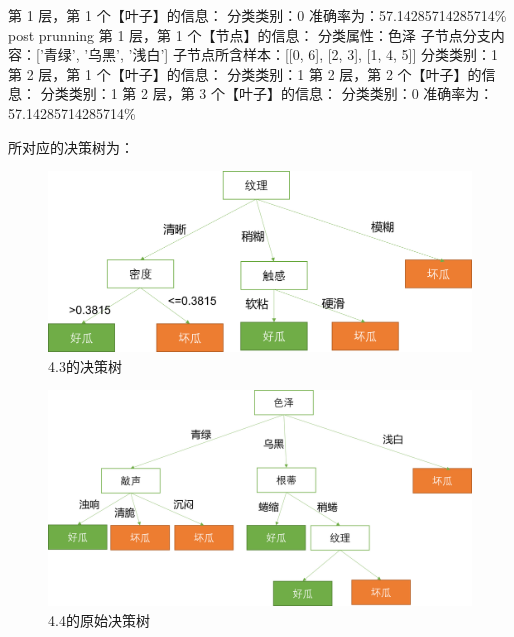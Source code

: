 \documentclass{ctexart}
\begin{document}
\begin{tcolorbox}[colframe = blue, colback = blue!10!white ,  breakable]
第 1 层，第 1 个【叶子】的信息：\newline
        分类类别：0\newline
准确率为：57.14285714285714\%\newline
post prunning\newline
第 1 层，第 1 个【节点】的信息：\newline
        分类属性：色泽\newline
        子节点分支内容：['青绿', '乌黑', '浅白']\newline
        子节点所含样本：[[0, 6], [2, 3], [1, 4, 5]]\newline
        分类类别：1\newline
第 2 层，第 1 个【叶子】的信息：\newline
        分类类别：1\newline
第 2 层，第 2 个【叶子】的信息：\newline
        分类类别：1\newline
第 2 层，第 3 个【叶子】的信息：\newline
        分类类别：0\newline
准确率为：57.14285714285714\%\newline
\end{tcolorbox}
所对应的决策树为：

\begin{figure}[htbp]
    \centering
    \label{fig:4.3}
    \includegraphics[scale=.5]{images/4.3.png}
    \caption{4.3的决策树}
\end{figure}


\begin{figure}[htbp]
    \centering
    \label{fig:4.4.1}
    \includegraphics[scale=.5]{images/4.4.1.png}
    \caption{4.4的原始决策树}
\end{figure}
\end{document}
